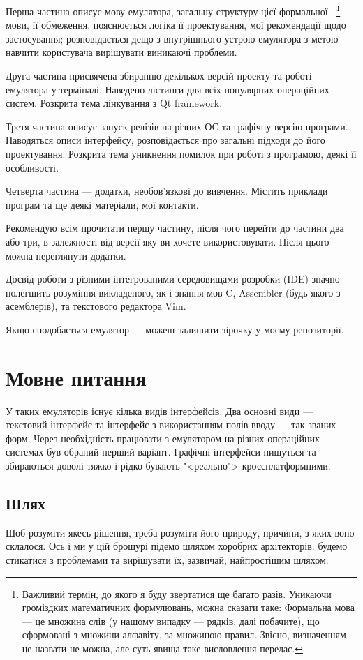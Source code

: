 \documentclass[oneside,final,14pt]{extreport}
\begin{document}
Перша частина описує мову емулятора, загальну структуру цієї формальної~
\footnote{Важливий термін, до якого я буду звертатися ще багато разів. Уникаючи громіздких математичних формулювань, можна сказати таке: Формальна мова --- це множина слів (у нашому випадку --- рядків, далі побачите), що сформовані з множини алфавіту, за множиною правил. Звісно, визначенням це назвати не можна, але суть явища таке висловлення передає.}
мови, її обмеження, пояснюється логіка її проектування, мої рекомендації щодо застосування; розповідається дещо з внутрішнього устрою емулятора з метою навчити користувача вирішувати виникаючі проблеми.

Друга частина присвячена збиранню декількох версій проекту та роботі емулятора у терміналі. Наведено лістинги для всіх популярних операційних систем. Розкрита тема лінкування з Qt framework.

Третя частина описує запуск релізів на різних ОС та графічну версію програми. Наводяться описи інтерфейсу, розповідається про загальні підходи до його проектування. Розкрита тема уникнення помилок при роботі з програмою, деякі її особливості.

Четверта частина --- додатки, необов'язкові до вивчення. Містить приклади програм та ще деякі матеріали, мої контакти.
\bigskip 

Рекомендую всім прочитати першу частину, після чого перейти до частини два або три, в залежності від версії яку ви хочете використовувати. Після цього можна переглянути додатки.

Досвід роботи з різними інтегрованими середовищами розробки (IDE) значно полегшить розуміння викладеного, як і знання мов C, Assembler (будь-якого з асемблерів), та текстового редактора Vim.

\bigskip 

Якщо сподобається емулятор --- можеш залишити зірочку у моєму репозиторії.

\chapter{Мовне питання}
У таких емуляторів існує кілька видів інтерфейсів. Два основні види --- текстовий інтерфейс та інтерфейс з використанням полів вводу --- так званих форм. Через необхідність працювати з емулятором на різних операційних системах був обраний перший варіант. Графічні інтерфейси пишуться та збираються доволі тяжко і рідко бувають "<реально"> кроссплатформними.
\section{Шлях}
Щоб розуміти якесь рішення, треба розуміти його природу, причини, з яких воно склалося. Ось і ми у цій брошурі підемо шляхом хоробрих архітекторів: будемо стикатися з проблемами та вирішувати їх, зазвичай, найпростішим шляхом.
\end{document}
